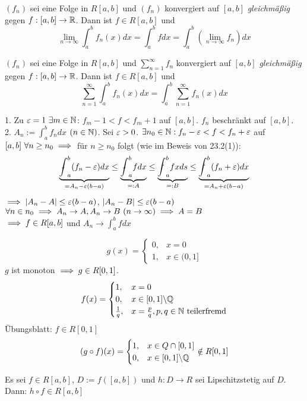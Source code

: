 \documentclass[a4paper,oneside,DIV15,BCOR12mm]{scrbook}
\begin{document}
\begin{satz}
$(f_n)$ sei eine Folge in $R[a,b]$ und $(f_n)$ konvergiert auf $[a,b]$ \emph{gleichmäßig} gegen $f:[a,b]\to\mathbb{R}$. Dann ist $f\in R[a,b]$ und 
$$\lim_{n\to\infty}\int_a^bf_n(x)dx  = \int_a^bfdx = \int_a^b(\lim_{n\to\infty} f_n)dx$$

$(f_n)$ sei eine Folge in $R[a,b]$ und $\sum_{n=1}^{\infty}f_n$ konvergiert auf $[a,b]$ \emph{gleichmäßig} gegen $f:[a,b]\to\mathbb{R}$. Dann ist $f\in R[a,b]$ und 
$$\sum_{n=1}^\infty \int_a^bf_n(x)dx = \int_a^b \sum_{n=1}^\infty f_n(x)dx $$
\end{satz}

\begin{beweis}
1. Zu $\varepsilon=1 \ \exists m \in \mathbb{N}$: $f_m-1<f<f_m+1$ auf $[a,b]$. $f_n$ beschränkt auf $[a,b]$. \\
2. $A_n := \int_a^bf_ndx$ $(n\in\mathbb{N})$. Sei $\varepsilon>0$. $\exists n_0\in\mathbb{N}: f_n-\varepsilon<f<f_n+\varepsilon$ auf $[a,b] \ \forall n\ge n_0 \implies$ für $n\ge n_0$ folgt (wie im Beweis von 23.2(1)): 
$$\underbrace{\uint_a^b(f_n-\ep)dx}_{=A_n-\ep(b-a)} \le \underbrace{\uint_a^bfdx}_{=: A} \le \underbrace{\oint_a^bfxds}_{=: B} \le \underbrace{\oint_a^b(f_n+\ep)dx}_{=A_n+\ep(b-a)}$$
$\implies |A_n - A| \le \varepsilon(b-a)$, $|A_n -B|\le \varepsilon (b-a)$ \\ 
$\forall n\in n_0 \implies A_n \to A, A_n \to B \ (n\to\infty) \implies A = B $ \\ 
$\implies f\in R[a,b]$ und $A_n \to \int_a^bfdx$
\end{beweis}

\begin{beispiel}
$$g(x) = \begin{cases} 0, & x=0 \\ 1, & x \in (0,1] \end{cases}$$
$g$ ist monoton $\implies g \in R[0,1]$.
$$f(x) = \begin{cases} 1, & x=0 \\ 0, & x \in [0,1]\backslash\mathbb{Q} \\ \frac{1}{q}, & x = \frac{p}{q}, p,q \in \mathbb{N} \text{ teilerfremd} \end{cases}$$
Übungsblatt: $f\in R[0,1]$
$$(g\circ f)(x) = \begin{cases}1, &x\in Q\cap[0,1] \\ 0, & x \in [0,1]\backslash \mathbb{Q} \end{cases} \notin R[0,1]$$
\end{beispiel}

\begin{satz}
Es sei $f\in R[a,b]$, $D := f([a,b])$ und $h: D \to R$ sei Lipschitzstetig auf $D$. Dann: $h\circ f \in R[a,b]$
\end{satz}
\end{document}
